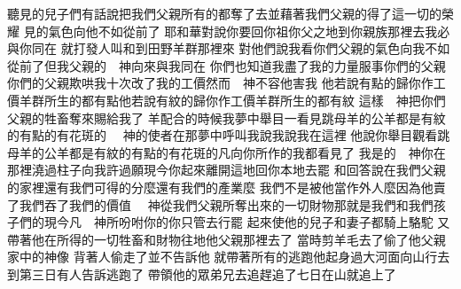 \bchapter%
聽見的兒子們有話說\chientien{}把我們父親所有的都奪了去\chientien 並藉著我們父親的\chientien 得了這一切的榮耀\chuan{}
見的氣色向他不如從前了\chuan 
{}耶和華對說\chientien 你要回你祖你父之地\chientien 到你親族那裡去\chientien 我必與你同在\chuan 
{}就打發人\chientien 叫和到田野羊群那裡來\yuentien 
{}對他們說\chientien 我看你們父親的氣色向我不如從前了\yuentien 但我父親的　神向來與我同在\chuan 
{}你們也知道\chientien 我盡了我的力量服事你們的父親\chuan 
{}你們的父親欺哄我\chientien 十次改了我的工價\yuentien 然而　神不容他害我\chuan 
{}他若說\chientien 有點的歸你作工價\chientien 羊群所生的都有點\yuentien 他若說\chientien 有紋的歸你作工價\chientien 羊群所生的都有紋\chuan 
{}這樣\chientien 　神把你們父親的牲畜奪來賜給我了\chuan 
{}羊配合的時候\chientien 我夢中舉目一看\chientien 見跳母羊的公羊\chientien 都是有紋的\chientien 有點的\chientien 有花斑的\chuan 
{}　神的使者在那夢中呼叫我說\chientien{}\chuan 我說\chientien 我在這裡\chuan 
{}他說\chientien 你舉目觀看\chientien 跳母羊的公羊都是有紋的\chientien 有點的\chientien 有花斑的\yuentien 凡向你所作的\chientien 我都看見了\chuan 
{}我是的　神\yuentien 你在那裡澆過柱子\chientien 向我許過願\yuentien 現今你起來離開這地\chientien 回你本地去罷\chuan 
{}和回答說\chientien 在我們父親的家裡還有我們可得的分麼\chientien 還有我們的產業麼\chuan 
{}我們不是被他當作外人麼\yuentien 因為他賣了我們\chientien 吞了我們的價值\chuan 
{}　神從我們父親所奪出來的一切財物\chientien 那就是我們\chientien 和我們孩子們的\yuentien 現今凡　神所吩咐你的\chientien 你只管去行罷\chuan\Chuan
{}起來\chientien 使他的兒子和妻子都騎上駱駝\yuentien 
{}又帶著他在所得的一切牲畜和財物\chientien 往地\chientien 他父親那裡去了\chuan 
{}當時剪羊毛去了\yuentien{}偷了他父親家中的神像\chuan 
{}背著人偷走了\chientien 並不告訴他\chuan 
{}就帶著所有的逃跑\yuentien 他起身過大河\chientien 面向山行去\chuan\Chuan
{}到第三日\chientien 有人告訴\chientien{}逃跑了\chuan 
{}帶領他的眾弟兄去追趕\chientien 追了七日\chientien 在山就追上了\chuan 
